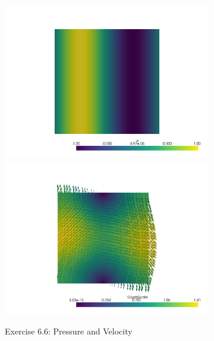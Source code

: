 \documentclass[a4paper,12pt]{article}
\theoremstyle{exerciseStyle}
\theoremstyle{solutionStyle}
\begin{document}
\begin{figure}[htbp]
    \centering
    \begin{subfigure}[t]{0.48\textwidth}
        \centering
        \includegraphics[width=\linewidth]{figs/pressure_66.png}
        \vspace{0.5em} %
        \includegraphics[width=\linewidth]{figs/velocity_66.png}
        \caption{Exercise 6.6: Pressure and Velocity}
        \label{fig:ex66}
    \end{subfigure}
    \hfill
    \begin{subfigure}[t]{0.48\textwidth}
        \centering

\end{subfigure}
\end{figure}
\end{document}
